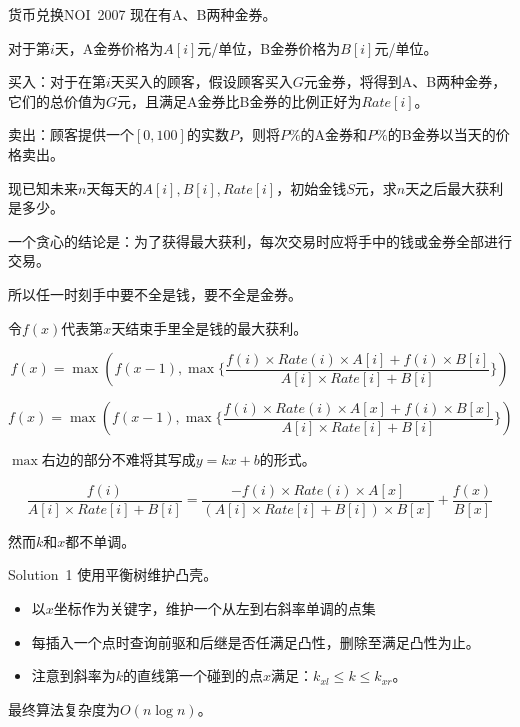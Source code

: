 \documentclass[9pt,dvipsnames,table,UTF8,aspectratio=169]{beamer}
\begin{document}
\begin{frame}{货币兑换}{NOI\ 2007}
       现在有A、B两种金券。

       对于第$i$天，A金券价格为$A[i]$元/单位，B金券价格为$B[i]$元/单位。
       
       买入：对于在第$i$天买入的顾客，假设顾客买入$G$元金券，将得到A、B两种金券，它们的总价值为$G$元，且满足A金券比B金券的比例正好为$Rate[i]$。
       
       卖出：顾客提供一个$[0,100]$的实数$P$，则将$P\%$的A金券和$P\%$的B金券以当天的价格卖出。
       
       现已知未来$n$天每天的$A[i],B[i],Rate[i]$，初始金钱$S$元，求$n$天之后最大获利是多少。
\end{frame}

\begin{frame}
	一个贪心的结论是：为了获得最大获利，每次交易时应将手中的钱或金券全部进行交易。

	所以任一时刻手中要不全是钱，要不全是金券。

	令$f(x)$代表第$x$天结束手里全是钱的最大获利。

	$$f(x) = \max{(f(x - 1), \max{\{\frac{f(i) \times Rate(i) \times A[i] + f(i) \times B[i]}{A[i] \times Rate[i] + B[i]}\}})}$$
\end{frame}

\begin{frame}
	$$f(x) = \max{(f(x - 1), \max{\{\frac{f(i) \times Rate(i) \times A[x] + f(i) \times B[x]}{A[i] \times Rate[i] + B[i]}\}})}$$

	$\max$右边的部分不难将其写成$y = kx + b$的形式。

	$$\frac{f(i)}{A[i] \times Rate[i] + B[i]} = \frac{-f(i) \times Rate(i) \times A[x]}{(A[i] \times Rate[i] + B[i]) \times B[x]} + \frac{f(x)}{B[x]}$$

	然而$k$和$x$都不单调。
\end{frame}

\begin{frame}{Solution\ 1}
	使用平衡树维护凸壳。
	
	\pause
	\begin{itemize}
		\item 以$x$坐标作为关键字，维护一个从左到右斜率单调的点集
		\item 每插入一个点时查询前驱和后继是否任满足凸性，删除至满足凸性为止。
		\item 注意到斜率为$k$的直线第一个碰到的点$x$满足：$k_{xl} \le k \le k_{xr}$。
	\end{itemize}

	最终算法复杂度为$O(n \log{n})$。
\end{frame}
\end{document}
